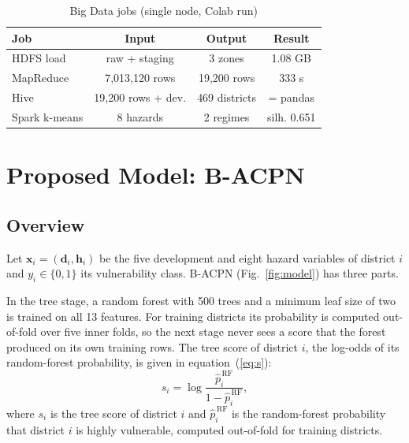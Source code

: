 \documentclass[conference]{IEEEtran}
\begin{document}
\begin{table}[!htb]
\centering
\caption{Big Data jobs (single node, Colab run)}
\label{tab:bigdata}
\footnotesize
\setlength{\tabcolsep}{3.5pt}
\begin{tabular}{lccc}
\toprule
Job & Input & Output & Result \\
\midrule
HDFS load & raw + staging & 3 zones & 1.08 GB \\
MapReduce & 7,013,120 rows & 19,200 rows & 333 s \\
Hive & 19,200 rows + dev. & 469 districts & = pandas \\
Spark k-means & 8 hazards & 2 regimes & silh. 0.651 \\
\bottomrule
\end{tabular}
\end{table}

\section{Proposed Model: B-ACPN}
\subsection{Overview}
Let $\mathbf{x}_i = (\mathbf{d}_i, \mathbf{h}_i)$ be the five development and eight hazard variables of district $i$ and $y_i \in \{0,1\}$ its vulnerability class. B-ACPN (Fig.~\ref{fig:model}) has three parts.

In the tree stage, a random forest \cite{breiman2001} with 500 trees and a minimum leaf size of two is trained on all 13 features. For training districts its probability is computed out-of-fold over five inner folds, so the next stage never sees a score that the forest produced on its own training rows. The tree score of district $i$, the log-odds of its random-forest probability, is given in equation~(\ref{eq:s}):
\begin{equation}\label{eq:s}
s_i = \log\frac{\hat p^{\,\text{RF}}_i}{1-\hat p^{\,\text{RF}}_i},
\end{equation}
\noindent where $s_i$ is the tree score of district $i$ and $\hat p^{\,\text{RF}}_i$ is the random-forest probability that district $i$ is highly vulnerable, computed out-of-fold for training districts.
\end{document}
